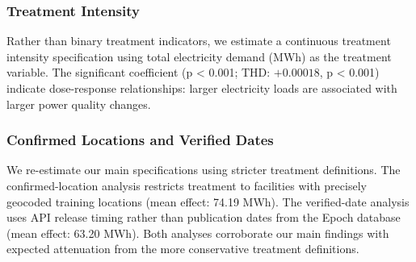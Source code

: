\documentclass[sigconf]{acmart}
\begin{document}
\subsubsection{Treatment Intensity}

Rather than binary treatment indicators, we estimate a continuous treatment intensity specification using total electricity demand (MWh) as the treatment variable. The significant coefficient (p < 0.001; THD: $+0.00018$, p < 0.001) indicate dose-response relationships: larger electricity loads are associated with larger power quality changes.

\subsubsection{Confirmed Locations and Verified Dates}

We re-estimate our main specifications using stricter treatment definitions. The confirmed-location analysis restricts treatment to facilities with precisely geocoded training locations (mean effect: 74.19 MWh). The verified-date analysis uses API release timing rather than publication dates from the Epoch database (mean effect: 63.20 MWh). Both analyses corroborate our main findings with expected attenuation from the more conservative treatment definitions.



\end{document}
